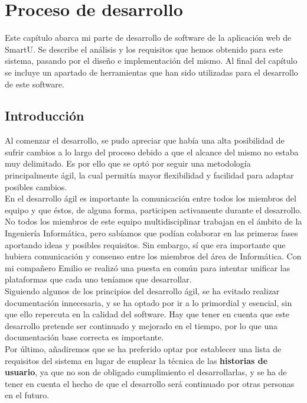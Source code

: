 \chapter{Proceso de desarrollo}
\label{ch:desarrollo}
Este capítulo abarca mi parte de desarrollo de software de la aplicación web de SmartU. Se describe el análisis y los requisitos que hemos obtenido para este sistema, pasando por el diseño e implementación del mismo. Al final del capítulo se incluye un apartado de herramientas que han sido utilizadas para el desarrollo de este software.

\section{Introducción}
Al comenzar el desarrollo, se pudo apreciar que había una alta posibilidad de sufrir cambios a lo largo del proceso debido a que el alcance del mismo no estaba muy delimitado. Es por ello que se optó por seguir una metodología principalmente ágil, la cual permitía mayor flexibilidad y facilidad para adaptar posibles cambios.\\

En el desarrollo ágil es importante la comunicación entre todos los miembros del equipo y que éstos, de alguna forma, participen activamente durante el desarrollo. No todos los miembros de este equipo multidisciplinar trabajan en el ámbito de la Ingeniería Informática, pero sabíamos que podían colaborar en las primeras fases aportando ideas y posibles requisitos. Sin embargo, sí que era importante que hubiera comunicación y consenso entre los miembros del área de Informática. Con mi compañero Emilio se realizó una puesta en común para intentar unificar las plataformas que cada uno teníamos que desarrollar.\\

Siguiendo algunos de los principios del desarrollo ágil, se ha evitado realizar documentación innecesaria, y se ha optado por ir a lo primordial y esencial, sin que ello repercuta en la calidad del software. Hay que tener en cuenta que este desarrollo pretende ser continuado y mejorado en el tiempo, por lo que una documentación base correcta es importante.\\

Por último, añadiremos que se ha preferido optar por establecer una lista de requisitos del sistema en lugar de emplear la técnica de las \textbf{historias de usuario}, ya que no son de obligado cumplimiento el desarrollarlas, y se ha de tener en cuenta el hecho de que el desarrollo será continuado por otras personas en el futuro.


